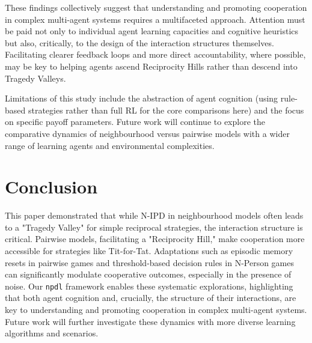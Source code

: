 \documentclass[]{llncs} %
\begin{document}
These findings collectively suggest that understanding and promoting cooperation in complex multi-agent systems requires a multifaceted approach. Attention must be paid not only to individual agent learning capacities and cognitive heuristics but also, critically, to the design of the interaction structures themselves. Facilitating clearer feedback loops and more direct accountability, where possible, may be key to helping agents ascend Reciprocity Hills rather than descend into Tragedy Valleys.

Limitations of this study include the abstraction of agent cognition (using rule-based strategies rather than full RL for the core comparisons here) and the focus on specific payoff parameters. Future work will continue to explore the comparative dynamics of neighbourhood versus pairwise models with a wider range of learning agents and environmental complexities.

\section{Conclusion}
\label{sec:conclusion}
This paper demonstrated that while N-IPD in neighbourhood models often leads to a "Tragedy Valley" for simple reciprocal strategies, the interaction structure is critical. Pairwise models, facilitating a "Reciprocity Hill," make cooperation more accessible for strategies like Tit-for-Tat. Adaptations such as episodic memory resets in pairwise games and threshold-based decision rules in N-Person games can significantly modulate cooperative outcomes, especially in the presence of noise. Our \texttt{npdl} framework enables these systematic explorations, highlighting that both agent cognition and, crucially, the structure of their interactions, are key to understanding and promoting cooperation in complex multi-agent systems. Future work will further investigate these dynamics with more diverse learning algorithms and scenarios.



\begin{subappendices} %
\label{app:original_results}


\end{subappendices}
\end{document}
